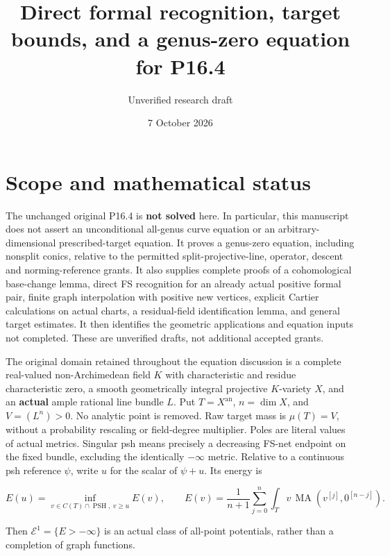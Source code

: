 \documentclass[
  11pt,
]{article}
\title{Direct formal recognition, target bounds, and a genus-zero
equation for P16.4}
\author{Unverified research draft}
\date{7 October 2026}
\begin{document}
\maketitle

\section{Scope and mathematical
status}\label{scope-and-mathematical-status}

The unchanged original P16.4 is \textbf{not solved} here. In particular,
this manuscript does not assert an unconditional all-genus curve
equation or an arbitrary-dimensional prescribed-target equation. It
proves a genus-zero equation, including nonsplit conics, relative to the
permitted split-projective-line, operator, descent and norming-reference
grants. It also supplies complete proofs of a cohomological base-change
lemma, direct FS recognition for an already actual positive formal pair,
finite graph interpolation with positive new vertices, explicit Cartier
calculations on actual charts, a residual-field identification lemma,
and general target estimates. It then identifies the geometric
applications and equation inputs not completed. These are unverified
drafts, not additional accepted grants.

The original domain retained throughout the equation discussion is a
complete real-valued non-Archimedean field \(K\) with characteristic and
residue characteristic zero, a smooth geometrically integral projective
\(K\)-variety \(X\), and an \textbf{actual} ample rational line bundle
\(L\). Put \(T=X^{\mathrm{an}}\), \(n=\dim X\), and \(V=(L^n)>0\). No
analytic point is removed. Raw target mass is \(\mu(T)=V\), without a
probability rescaling or field-degree multiplier. Poles are literal
values of actual metrics. Singular psh means precisely a decreasing
FS-net endpoint on the fixed bundle, excluding the identically
\(-\infty\) metric. Relative to a continuous psh reference \(\psi\),
write \(u\) for the scalar of \(\psi+u\). Its energy is

\[
E(u)=\inf_{v\in C(T)\cap\operatorname{PSH},\ v\geq u}E(v),
\qquad
E(v)=\frac1{n+1}\sum_{j=0}^n
 \int_Tv\,\operatorname{MA}(v^{[j]},0^{[n-j]}).
\]

Then \(\mathcal E^1=\{E>-\infty\}\) is an actual class of all-point
potentials, rather than a completion of graph functions.
\end{document}
